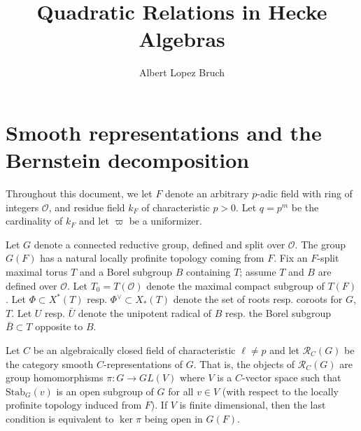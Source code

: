 \documentclass{article}
\title{Quadratic Relations in Hecke Algebras}
\author{Albert Lopez Bruch}
\newcommand{\cR}{\mathcal{R}}
\newcommand{\RR}{\mathbb{R}}
\theoremstyle{plain}
\theoremstyle{definition}
\begin{document}
	\maketitle
    \section{Smooth representations and the Bernstein decomposition}

    Throughout this document, we let $F$ denote an arbitrary $p$-adic field with ring of integers $\mathcal{O}$, and residue field $k_F$ of characteristic $p>0$. Let $q=p^m$ be the cardinality of $k_F$ and let $\varpi$ be a uniformizer.

    Let $G$ denote a connected reductive group, defined and split over $\mathcal{O}$. The group $G(F)$ has a natural locally profinite topology coming from $F$. Fix an $F$-split
    maximal torus $T$ and a Borel subgroup $B$ containing $T$; assume $T$ and $B$ are defined over $\mathcal{O}$. Let $T_0=T(\mathcal{O})$ denote the maximal compact subgroup of $T(F)$. Let $\Phi\subset X^*(T)$ resp. $\Phi^\vee \subset X_*(T)$ denote the set of roots resp. coroots for $G$, $T$. Let $U$ resp. $\bar{U}$ denote the
    unipotent radical of $B$ resp. the Borel subgroup $\bar B \subset T$ opposite to $B$.


    Let $C$ be an algebraically closed field of characteristic $\ell\neq p$ and let $\cR_{C}(G)$ be the category smooth $C$-representations of $G$. That is, the objects of $\cR_{C}(G)$ are group homomorphisms $\pi: G\rightarrow GL(V)$ where $V$ is a $C$-vector space such that $\mathrm{Stab}_G(v)$ is an open subgroup of $G$ for all $v\in V$ (with respect to the locally profinite topology induced from $F$). If $V$ is finite dimensional, then the last condition is equivalent to $\ker\pi$ being open in $G(F)$. 
\end{document}
